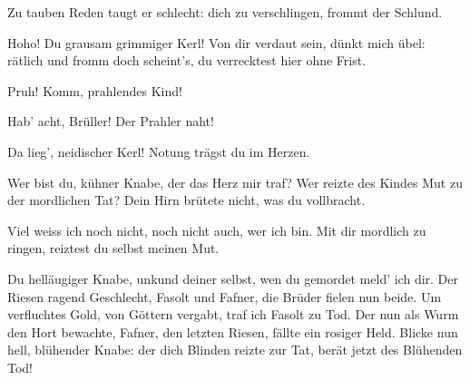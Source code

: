 \begin{drama}
\Fafnerspeaks

Zu tauben Reden
taugt er schlecht:
dich zu verschlingen,
frommt der Schlund.


\Siegfriedspeaks

Hoho! Du grausam
grimmiger Kerl!
Von dir verdaut sein,
dünkt mich übel:
rätlich und fromm doch scheint's,
du verrecktest hier ohne Frist.

\Fafnerspeaks


Pruh! Komm,
prahlendes Kind!

\Siegfriedspeaks

Hab' acht, Brüller!
Der Prahler naht!


Da lieg', neidischer Kerl!
Notung trägst du im Herzen.

\Fafnerspeaks


Wer bist du, kühner Knabe,
der das Herz mir traf?
Wer reizte des Kindes Mut
zu der mordlichen Tat?
Dein Hirn brütete nicht,
was du vollbracht.

\Siegfriedspeaks

Viel weiss ich noch nicht,
noch nicht auch, wer ich bin.
Mit dir mordlich zu ringen,
reiztest du selbst meinen Mut.

\Fafnerspeaks

Du helläugiger Knabe,
unkund deiner selbst,
wen du gemordet
meld' ich dir.
Der Riesen ragend Geschlecht,
Fasolt und Fafner,
die Brüder fielen nun beide.
Um verfluchtes Gold,
von Göttern vergabt,
traf ich Fasolt zu Tod.
Der nun als Wurm
den Hort bewachte,
Fafner, den letzten Riesen,
fällte ein rosiger Held.
Blicke nun hell,
blühender Knabe:
der dich Blinden reizte zur Tat,
berät jetzt des Blühenden Tod!


\end{drama}
